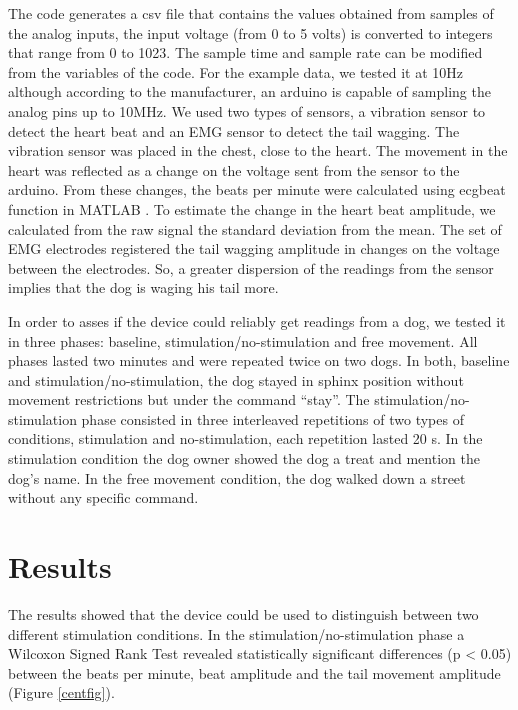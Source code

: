 \documentclass[twocolumn]{bmcart}%
\begin{document}
The code generates a csv file that contains the values obtained from
samples of the analog inputs, the input voltage (from 0 to 5 volts) is
converted to integers that range from 0 to 1023. The sample time and
sample rate can be modified from the variables of the code. For the
example data, we tested it at 10Hz although according to the
manufacturer, an arduino is capable of sampling the analog pins up to
10MHz. We used two types of sensors, a vibration sensor to detect the
heart beat and an EMG sensor to detect the tail wagging. The vibration
sensor was placed in the chest, close to the heart. The movement in the
heart was reflected as a change on the voltage sent from the sensor to
the arduino. From these changes, the beats per minute were calculated
using ecgbeat function in MATLAB \cite{ecgbeat}. To estimate the change
in the heart beat amplitude, we calculated from the raw signal the
standard deviation from the mean. The set of EMG electrodes registered
the tail wagging amplitude in changes on the voltage between the
electrodes. So, a greater dispersion of the readings from the sensor
implies that the dog is waging his tail more.

In order to asses if the device could reliably get readings from a dog,
we tested it in three phases: baseline, stimulation/no-stimulation and
free movement. All phases lasted two minutes and were repeated twice on
two dogs. In both, baseline and stimulation/no-stimulation, the dog
stayed in sphinx position without movement restrictions but under the
command ``stay''. The stimulation/no-stimulation phase consisted in
three interleaved repetitions of two types of conditions, stimulation
and no-stimulation, each repetition lasted 20 s. In the stimulation
condition the dog owner showed the dog a treat and mention the dog's
name. In the free movement condition, the dog walked down a street
without any specific command.

\section{Results}\label{results}

The results showed that the device could be used to distinguish between
two different stimulation conditions. In the stimulation/no-stimulation
phase a Wilcoxon Signed Rank Test revealed statistically significant
differences (p \textless{} 0.05) between the beats per minute, beat
amplitude and the tail movement amplitude (Figure \ref{centfig}).
\end{document}

